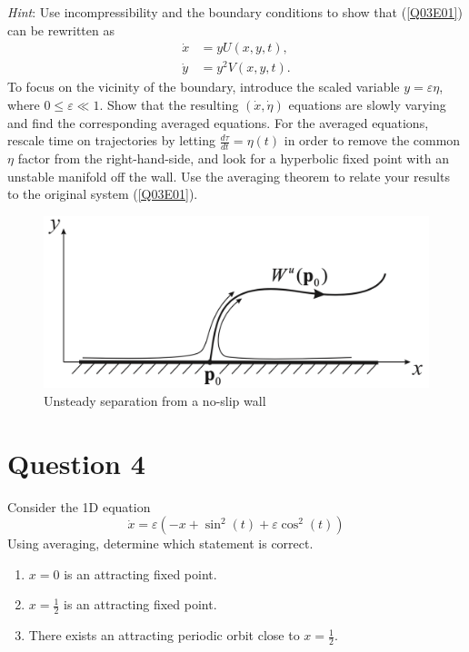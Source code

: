 \documentclass[twoside,10pt,a4paper]{article}
\begin{document}
\textit{Hint}: Use incompressibility and the boundary conditions to show that (\ref{Q03E01}) can be rewritten as
\begin{align*}
	\dot{x} &= yU(x,y,t), \\
	\dot{y} &= y^2V(x,y,t).
\end{align*}
To focus on the vicinity of the boundary, introduce the scaled variable $y=\varepsilon \eta$, where $0 \leq \varepsilon \ll 1$. Show that the resulting $(\dot{x},\dot{\eta})$ equations are slowly varying and find the corresponding averaged equations. For the averaged equations, rescale time on trajectories by letting $\frac{d\tau}{dt} = \eta(t)$ in order to remove the common $\eta$ factor from the right-hand-side, and look for a hyperbolic fixed point with an unstable manifold off the wall. Use the averaging theorem to relate your results to the original system (\ref{Q03E01}).

\begin{figure}[H]
	\centering
	\includegraphics[scale=0.15]{Graphics/Q03D01.png}
	\caption{Unsteady separation from a no-slip wall}
\end{figure}

\section*{Question 4}
Consider the 1D equation
\begin{equation*}
	\dot{x} = \varepsilon (-x + \sin^2(t) + \varepsilon \cos^2(t))
\end{equation*}
Using averaging, determine which statement is correct.

\begin{enumerate}[label=(\alph*)]
	\item $x = 0$ is an attracting fixed point.
	\item $\displaystyle x = \frac{1}{2}$ is an attracting fixed point.
	\item There exists an attracting periodic orbit close to $\displaystyle x = \frac{1}{2}$.
\end{enumerate}
\end{document}
